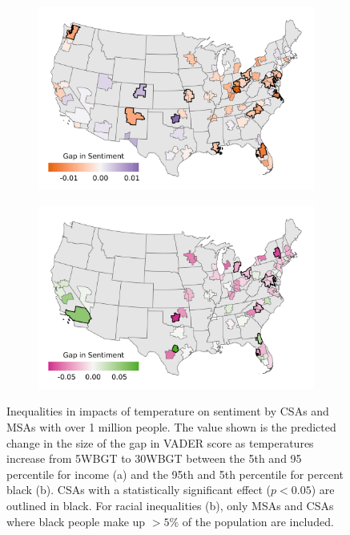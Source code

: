 \documentclass[fleqn,10pt]{wlscirep}
\begin{document}
\begin{figure}[H]
\centering
\begin{subfigure}{0.75\textwidth}
  \includegraphics[width=\linewidth]{../res/map_wbgt_income.png}
  \caption{}
  \label{fig:map1}
\end{subfigure}
\begin{subfigure}{0.75\textwidth}
  \includegraphics[width=\linewidth]{../res/map_wbgt_black.png}
  \caption{}
  \label{fig:map2}
\end{subfigure}
\caption{Inequalities in impacts of temperature on sentiment by CSAs and MSAs with over 1 million people.  The value shown is the predicted change in the size of the gap in VADER score as temperatures increase from 5WBGT to 30WBGT between the 5th and 95 percentile for income (a) and the 95th and 5th percentile for percent black (b).  CSAs with a statistically significant effect ($p < 0.05$) are outlined in black.  For racial inequalities (b), only MSAs and CSAs where black people make up $> 5\%$ of the population are included.}
\label{fig:test}
\end{figure}
\end{document}
